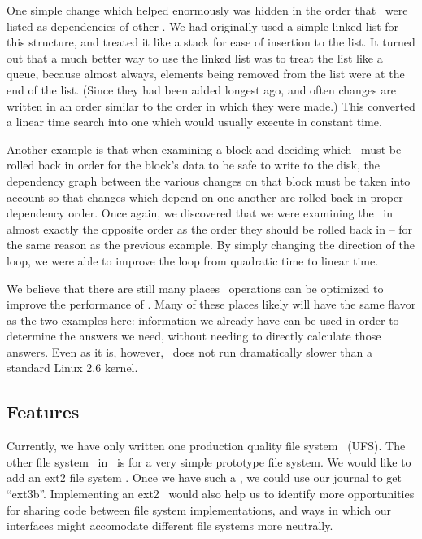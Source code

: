 One simple change which helped enormously was hidden in the order that \chdescs\
were listed as dependencies of other \chdescs. We had originally used a simple
linked list for this structure, and treated it like a stack for ease of
insertion to the list. It turned out that a much better way to use the linked
list was to treat the list like a queue, because almost always, elements being
removed from the list were at the end of the list. (Since they had been added
longest ago, and often changes are written in an order similar to the order in
which they were made.) This converted a linear time search into one which would
usually execute in constant time.

Another example is that when examining a block and deciding which \chdescs\ must
be rolled back in order for the block's data to be safe to write to the disk,
the dependency graph between the various changes on that block must be taken
into account so that changes which depend on one another are rolled back in
proper dependency order. Once again, we discovered that we were examining the
\chdescs\ in almost exactly the opposite order as the order they should be
rolled back in -- for the same reason as the previous example. By simply
changing the direction of the loop, we were able to improve the loop from
quadratic time to linear time.

We believe that there are still many places \chdesc\ operations can be optimized
to improve the performance of \Kudos. Many of these places likely will have the
same flavor as the two examples here: information we already have can be used in
order to determine the answers we need, without needing to directly calculate
those answers. Even as it is, however, \Kudos\ does not run dramatically slower
than a standard Linux 2.6 kernel.


\subsection {Features}
Currently, we have only written one production quality file system \module\
(UFS). The other file system \module\ in \Kudos\ is for a very simple prototype
file system. We would like to add an ext2 file system \module. Once we have such
a \module, we could use our journal \module to get ``ext3b''. Implementing an
ext2 \module\ would also help us to identify more opportunities for sharing code
between file system implementations, and ways in which our interfaces might
accomodate different file systems more neutrally.

